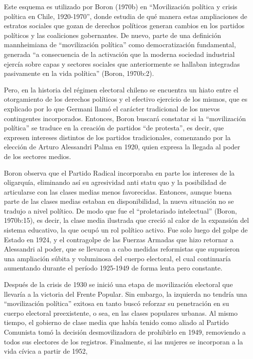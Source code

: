 Este esquema es utilizado por Boron (1970b) en ``Movilización política y crisis política en Chile, 1920-1970'', donde estudia de qué manera estas ampliaciones de estratos sociales que gozan de derechos políticos generan cambios en los partidos políticos y las coaliciones gobernantes. De nuevo, parte de una definición mannheimiana de ``movilización política'' como democratización fundamental, generada ``a consecuencia de la activación que la moderna sociedad industrial ejercía sobre capas y sectores sociales que anteriormente se hallaban integradas pasivamente en la vida política'' (Boron, 1970b:2).

Pero, en la historia del régimen electoral chileno se encuentra un hiato entre el otorgamiento de los derechos políticos y el efectivo ejercicio de los mismos, que es explicado por lo que Germani llamó el carácter tradicional de los nuevos contingentes incorporados. Entonces, Boron buscará constatar si la ``movilización política'' se traduce en la creación de partidos ``de protesta'', es decir, que expresen intereses distintos de los partidos tradicionales, comenzando por la elección de Arturo Alessandri Palma en 1920, quien expresa la llegada al poder de los sectores medios.

Boron observa que el Partido Radical incorporaba en parte los intereses de la oligarquía, eliminando así su agresividad anti statu quo y la posibilidad de articularse con las clases medias menos favorecidas. Entonces, aunque buena parte de las clases medias estaban en disponibilidad, la nueva situación no se tradujo a nivel político. De modo que fue el ``proletariado intelectual'' (Boron, 1970b:15), es decir, la clase media ilustrada que creció al calor de la expansión del sistema educativo, la que ocupó un rol político activo. Fue solo luego del golpe de Estado en 1924, y el contragolpe de las Fuerzas Armadas que hizo retornar a Alessandri al poder, que se llevaron a cabo medidas reformistas que supusieron una ampliación súbita y voluminosa del cuerpo electoral, el cual continuaría aumentando durante el período 1925-1949 de forma lenta pero constante.

Después de la crisis de 1930 se inició una etapa de movilización electoral que llevaría a la victoria del Frente Popular. Sin embargo, la izquierda no tendría una ``movilización política'' exitosa en tanto buscó reforzar su penetración en su cuerpo electoral preexistente, o sea, en las clases populares urbanas. Al mismo tiempo, el gobierno de clase media que había tenido como aliado al Partido Comunista tomó la decisión desmovilizadora de prohibirlo en 1949, removiendo a todos sus electores de los registros. Finalmente, si las mujeres se incorporan a la vida cívica a partir de 1952,

